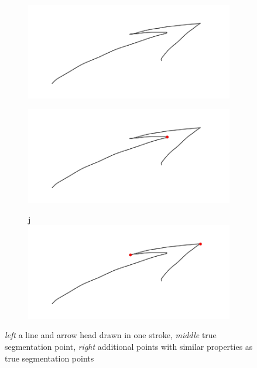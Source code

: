 \begin{figure}
	\centering
	\begin{subfigure}{0.3\textwidth}
		\centering
		\includegraphics[scale=0.2]{./img/seg_orig.jpg}
	\end{subfigure}
	\begin{subfigure}{0.3\textwidth}
		\centering
		\includegraphics[scale=0.2]{./img/seg_true_seg.jpg}
	\end{subfigure}
	\begin{subfigure}{0.3\textwidth}j
		\centering
		\includegraphics[scale=0.2]{./img/seg_false_seg.jpg}
	\end{subfigure}
	\caption{\textit{left} a line and arrow head drawn in one stroke, \textit{middle} true segmentation point, \textit{right} additional points with similar properties as true segmentation points}
	\label{fig:seg_false_neg}
\end{figure}

